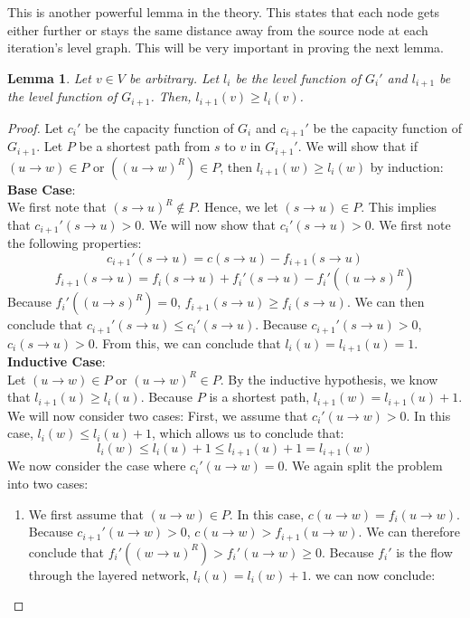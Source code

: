 \documentclass{report}
\newtheorem{lemma}{Lemma}[section]
\begin{document}
This is another powerful lemma in the theory. This states that each node gets either further or stays the same distance away from the source node at each iteration's level graph. This will be very important in proving the next lemma.
\begin{lemma}
    Let $v \in V$ be arbitrary. Let $l_i$ be the level function of $G_i'$ and $l_{i+1}$ be the level function of $G_{i+1}$. Then, $l_{i+1}(v) \ge l_i(v)$.
\end{lemma}
\begin{proof}
    Let $c_i'$ be the capacity function of $G_i$ and $c_{i+1}'$ be the capacity function of $G_{i+1}$. Let $P$ be a shortest path from $s$ to $v$ in $G_{i+1}'$. We will show that if $(u \rightarrow w) \in P$ or $((u \rightarrow w)^R) \in P$, then $l_{i+1}(w) \ge l_i(w)$ by induction:\\
    \textbf{Base Case}:\\
        We first note that $(s \rightarrow u)^R \not\in P$. Hence, we let $(s \rightarrow u) \in P$. This implies that $c_{i+1}'(s \rightarrow u) > 0$. We will now show that $c_i'(s \rightarrow u) > 0$. We first note the following properties:
        $$c_{i+1}'(s \rightarrow u) = c(s \rightarrow u) - f_{i+1}(s \rightarrow u)$$
        $$f_{i+1}(s \rightarrow u) = f_i(s \rightarrow u) + f_i'(s \rightarrow u) - f_i'((u \rightarrow s)^R)$$
        Because $f_i'((u \rightarrow s)^R) = 0$, $f_{i+1}(s \rightarrow u) \ge f_i(s \rightarrow u)$. We can then conclude that $c_{i+1}'(s \rightarrow u) \le c_i'(s \rightarrow u)$. Because $c_{i+1}'(s \rightarrow u) > 0$, $c_i(s \rightarrow u) > 0$. From this, we can conclude that $l_i(u) = l_{i+1}(u) = 1$.\\
    \textbf{Inductive Case}:\\
        Let $(u \rightarrow w) \in P$ or $(u \rightarrow w)^R \in P$. By the inductive hypothesis, we know that $l_{i+1}(u) \ge l_i(u)$. Because $P$ is a shortest path, $l_{i+1}(w) = l_{i+1}(u) + 1$. We will now consider two cases:
        First, we assume that $c_i'(u \rightarrow w) > 0$. In this case, $l_i(w) \le l_i(u) + 1$, which allows us to conclude that:
        $$l_i(w) \le l_i(u) + 1 \le l_{i+1}(u) + 1 = l_{i+1}(w)$$
        We now consider the case where $c_i'(u \rightarrow w) = 0$. We again split the problem into two cases:
        \begin{enumerate}
            \item
                We first assume that $(u \rightarrow w) \in P$. In this case, $c(u \rightarrow w) = f_i(u \rightarrow w)$. Because $c_{i+1}'(u \rightarrow w) > 0$, $c(u \rightarrow w) > f_{i+1}(u \rightarrow w)$. We can therefore conclude that $f_i'((w \rightarrow u)^R) > f_i'(u \rightarrow w) \ge 0$. Because $f_i'$ is the flow through the layered network, $l_i(u) = l_i(w) + 1$. we can now conclude:

\end{enumerate}
\end{proof}
\end{document}
